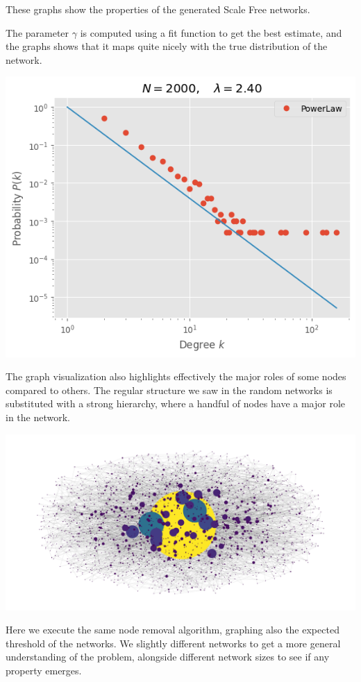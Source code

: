 \documentclass[
]{article}
\begin{document}
These graphs show the properties of the generated Scale Free networks.

The parameter \(\gamma\) is computed using a fit function to get the
best estimate, and the graphs shows that it maps quite nicely with the
true distribution of the network.

\includegraphics{./assets/2000_lambda_est.png}

The graph visualization also highlights effectively the major roles of
some nodes compared to others. The regular structure we saw in the
random networks is substituted with a strong hierarchy, where a handful
of nodes have a major role in the network.

\includegraphics{assets/scalefree_draw.png}

Here we execute the same node removal algorithm, graphing also the
expected threshold of the networks. We slightly different networks to
get a more general understanding of the problem, alongside different
network sizes to see if any property emerges.
\end{document}
